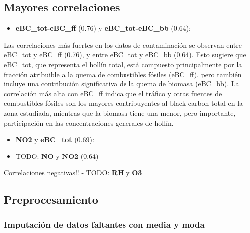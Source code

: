\documentclass[11pt]{article}
\providecommand{\tightlist}{%
      \setlength{\itemsep}{0pt}\setlength{\parskip}{0pt}}
\begin{document}
    \hypertarget{mayores-correlaciones}{%
\subsection{Mayores correlaciones}\label{mayores-correlaciones}}

\begin{itemize}
\tightlist
\item
  \textbf{eBC\_tot-eBC\_ff} (0.76) y \textbf{eBC\_tot-eBC\_bb} (0.64):
\end{itemize}

Las correlaciones más fuertes en los datos de contaminación se observan
entre eBC\_tot y eBC\_ff (0.76), y entre eBC\_tot y eBC\_bb (0.64). Esto
sugiere que eBC\_tot, que representa el hollín total, está compuesto
principalmente por la fracción atribuible a la quema de combustibles
fósiles (eBC\_ff), pero también incluye una contribución significativa
de la quema de biomasa (eBC\_bb). La correlación más alta con eBC\_ff
indica que el tráfico y otras fuentes de combustibles fósiles son los
mayores contribuyentes al black carbon total en la zona estudiada,
mientras que la biomasa tiene una menor, pero importante, participación
en las concentraciones generales de hollín.

\begin{itemize}
\item
  \textbf{NO2} y \textbf{eBC\_tot} (0.69):
\item
  TODO: \textbf{NO} y \textbf{NO2} (0.64)
\end{itemize}

Correlaciones negativas!! - TODO: \textbf{RH} y \textbf{O3}

    \hypertarget{preprocesamiento}{%
\subsection{Preprocesamiento}\label{preprocesamiento}}

    \hypertarget{imputaciuxf3n-de-datos-faltantes-con-media-y-moda}{%
\subsubsection{Imputación de datos faltantes con media y
moda}\label{imputaciuxf3n-de-datos-faltantes-con-media-y-moda}}
\end{document}
